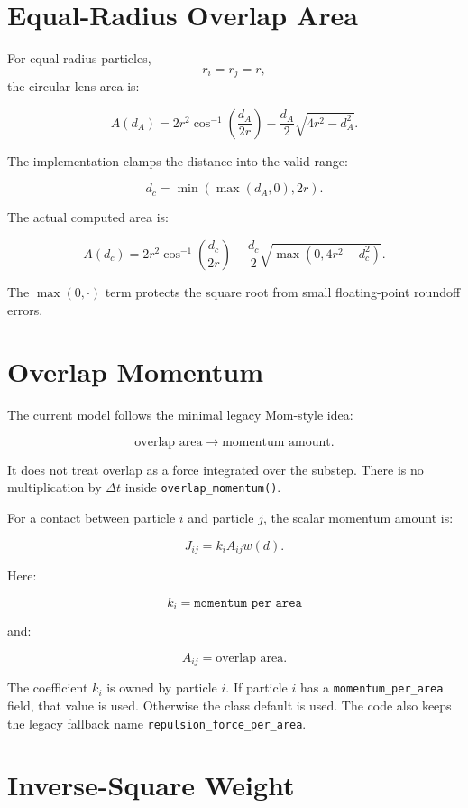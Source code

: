 \documentclass[11pt]{article}
\begin{document}
\section{Equal-Radius Overlap Area}

For equal-radius particles,
\[
    r_i=r_j=r,
\]
the circular lens area is:

\[
    A(d_A)
    =
    2r^2\cos^{-1}\left(\frac{d_A}{2r}\right)
    -
    \frac{d_A}{2}\sqrt{4r^2-d_A^2}.
\]

The implementation clamps the distance into the valid range:

\[
    d_c
    =
    \min(\max(d_A,0),2r).
\]

The actual computed area is:

\[
    A(d_c)
    =
    2r^2\cos^{-1}\left(\frac{d_c}{2r}\right)
    -
    \frac{d_c}{2}\sqrt{\max(0,4r^2-d_c^2)}.
\]

The \(\max(0,\cdot)\) term protects the square root from small floating-point
roundoff errors.

\section{Overlap Momentum}

The current model follows the minimal legacy Mom-style idea:

\[
    \text{overlap area}
    \rightarrow
    \text{momentum amount}.
\]

It does not treat overlap as a force integrated over the substep. There is no
multiplication by \(\Delta t\) inside \texttt{overlap\_momentum()}.

For a contact between particle \(i\) and particle \(j\), the scalar momentum
amount is:

\[
    J_{ij}
    =
    k_i A_{ij} w(d).
\]

Here:

\[
    k_i = \texttt{momentum\_per\_area}
\]

and:

\[
    A_{ij} = \text{overlap area}.
\]

The coefficient \(k_i\) is owned by particle \(i\). If particle \(i\) has a
\texttt{momentum\_per\_area} field, that value is used. Otherwise the class
default is used. The code also keeps the legacy fallback name
\texttt{repulsion\_force\_per\_area}.

\section{Inverse-Square Weight}
\end{document}
